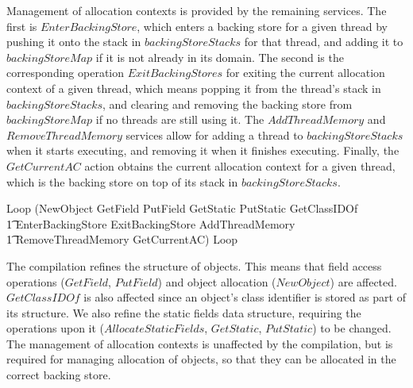 Management of allocation contexts is provided by the remaining
services.
The first is $EnterBackingStore$, which enters a backing store for a
given thread by pushing it onto the stack in $backingStoreStacks$ for
that thread, and adding it to $backingStoreMap$ if it is not already
in its domain.
The second is the corresponding operation $ExitBackingStores$ for
exiting the current allocation context of a given thread, which means
popping it from the thread's stack in $backingStoreStacks$, and
clearing and removing the backing store from $backingStoreMap$ if no
threads are still using it.
The $AddThreadMemory$ and $RemoveThreadMemory$ services allow for
adding a thread to $backingStoreStacks$ when it starts executing, and
removing it when it finishes executing.
Finally, the $GetCurrentAC$ action obtains the current allocation
context for a given thread, which is the backing store on top of its
stack in $backingStoreStacks$.
\begin{circusaction}
  Loop \circdef (NewObject \extchoice GetField \extchoice PutField \extchoice GetStatic \extchoice PutStatic \extchoice GetClassIDOf \\
  \t1 {} \extchoice EnterBackingStore \extchoice ExitBackingStore \extchoice AddThreadMemory \\
  \t1 {} \extchoice RemoveThreadMemory \extchoice GetCurrentAC)
  \circseq Loop
\end{circusaction}

The compilation refines the structure of objects.
This means that field access operations ($GetField$, $PutField$) and
object allocation ($NewObject$) are affected.
$GetClassIDOf$ is also affected since an object's class identifier is
stored as part of its structure.
We also refine the static fields data structure, requiring the
operations upon it ($AllocateStaticFields$, $GetStatic$, $PutStatic$)
to be changed.
The management of allocation contexts is unaffected by the
compilation, but is required for managing allocation of objects, so
that they can be allocated in the correct backing store.

